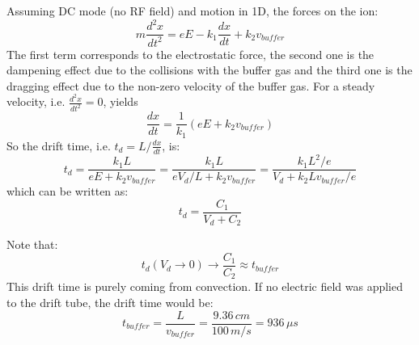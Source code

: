 Assuming DC mode (no RF field) and motion in 1D, the forces on the ion:
\begin{equation}
m\frac{d^2x}{dt^2} = eE - k_1\frac{dx}{dt} + k_2 v_{buffer}
\end{equation}
The first term corresponds to the electrostatic force, the second one is the dampening effect due to the collisions with the buffer gas and the third one is the dragging effect due to the non-zero velocity of the buffer gas.
For a steady velocity, i.e. $\frac{d^2x}{dt^2} = 0$, yields
\begin{equation}
\frac{dx}{dt} = \frac{1}{k_1} \left( eE + k_2 v_{buffer} \right)
\end{equation}
So the drift time, i.e. $t_d = L/\frac{dx}{dt}$, is:
\begin{equation}
t_d = \frac{k_1 L}{eE +k_2 v_{buffer}} = \frac{k_1 L}{eV_d/L + k_2 v_{buffer}} = \frac{k_1 L^2/e}{V_d + k_2 L v_{buffer}/e}
\end{equation}
which can be written as:
\begin{equation}
t_d = \frac{C_1}{V_d + C_2}
\label{eq:sds_t}
\end{equation}


Note that:
\begin{equation}
t_d(V_d\rightarrow0) \rightarrow \frac{C_1}{C_2} \approx  t_{buffer}
\end{equation}
This drift time is purely coming from convection. If no electric field was applied to the drift tube, the drift time would be:
\begin{equation}
t_{buffer} = \frac{L}{v_{buffer}} = \frac{9.36\,cm}{100\,m/s} = 936\, \mu s
\end{equation}






